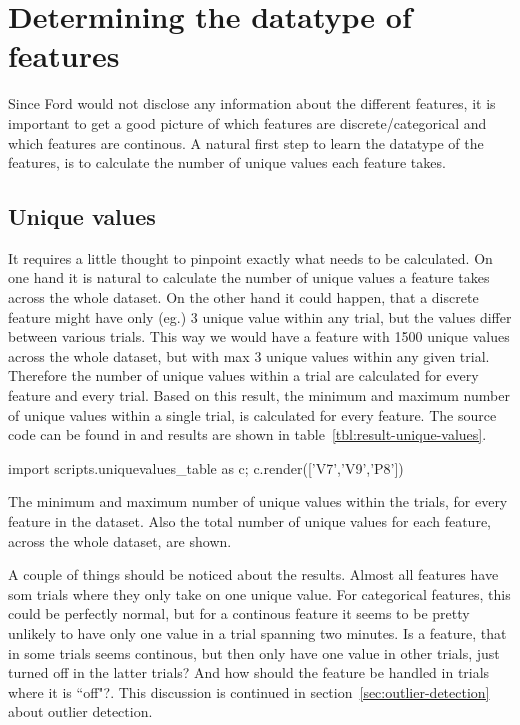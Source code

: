 \section{Determining the datatype of features}
Since Ford would not disclose any information about the different features, it is important to get a good picture of which features are discrete/categorical and which features are continous. A natural first step to learn the datatype of the features, is to calculate the number of unique values each feature takes.
\subsection{Unique values}\label{sec:unique-values}
It requires a little thought to pinpoint exactly what needs to be calculated. On one hand it is natural to calculate the number of unique values a feature takes across the whole dataset. On the other hand it could happen, that a discrete feature might have only (eg.) 3 unique value within any trial, but the values differ between various trials. This way we would have a feature with 1500 unique values across the whole dataset, but with max 3 unique values within any given trial. Therefore the number of unique values within a trial are calculated for every feature and every trial. Based on this result, the minimum and maximum number of unique values within a single trial, is calculated for every feature. The source code can be found in  and results are shown in table~\ref{tbl:result-unique-values}. \par
\begin{table}
    {\small\sffamily
        \begin{python}
            import scripts.uniquevalues_table as c; c.render(['V7','V9','P8'])
        \end{python}
    }
    \caption{The minimum and maximum number of unique values within the trials, for every feature in the dataset. Also the total number of unique values for each feature, across the whole dataset, are shown.}
    \label{tbl:result-unique-values}
\end{table}
A couple of things should be noticed about the results. Almost all features have som trials where they only take on one unique value. For categorical features, this could be perfectly normal, but for a continous feature it seems to be pretty unlikely to have only one value in a trial spanning two minutes. Is a feature, that in some trials seems continous, but then only have one value in other trials, just turned off in the latter trials? And how should the feature be handled in trials where it is ``off"?. This discussion is continued in section~\ref{sec:outlier-detection} about outlier detection. \par

